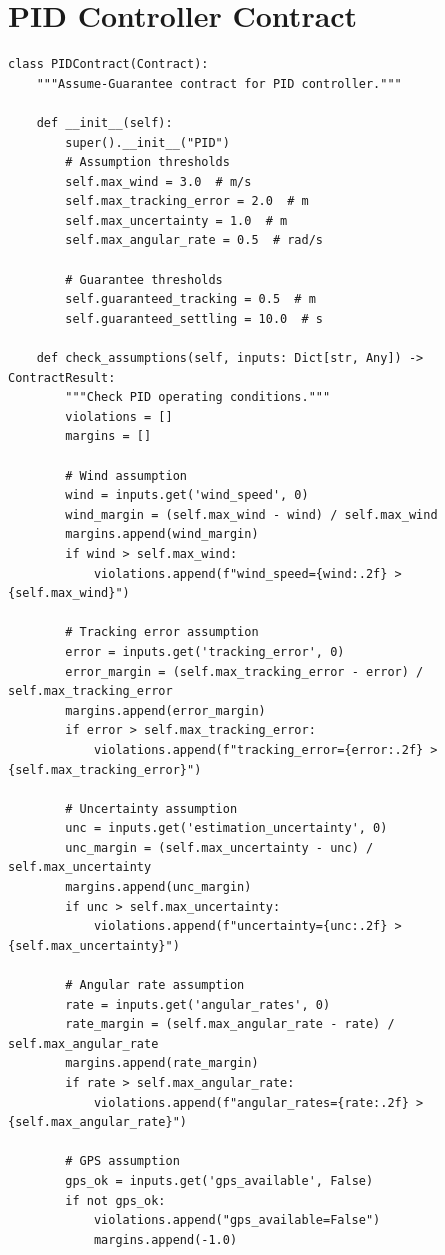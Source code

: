 \section{PID Controller Contract}

\begin{lstlisting}[caption={PID controller contract implementation}, label=lst:pid_contract]
class PIDContract(Contract):
    """Assume-Guarantee contract for PID controller."""

    def __init__(self):
        super().__init__("PID")
        # Assumption thresholds
        self.max_wind = 3.0  # m/s
        self.max_tracking_error = 2.0  # m
        self.max_uncertainty = 1.0  # m
        self.max_angular_rate = 0.5  # rad/s

        # Guarantee thresholds
        self.guaranteed_tracking = 0.5  # m
        self.guaranteed_settling = 10.0  # s

    def check_assumptions(self, inputs: Dict[str, Any]) -> ContractResult:
        """Check PID operating conditions."""
        violations = []
        margins = []

        # Wind assumption
        wind = inputs.get('wind_speed', 0)
        wind_margin = (self.max_wind - wind) / self.max_wind
        margins.append(wind_margin)
        if wind > self.max_wind:
            violations.append(f"wind_speed={wind:.2f} > {self.max_wind}")

        # Tracking error assumption
        error = inputs.get('tracking_error', 0)
        error_margin = (self.max_tracking_error - error) / self.max_tracking_error
        margins.append(error_margin)
        if error > self.max_tracking_error:
            violations.append(f"tracking_error={error:.2f} > {self.max_tracking_error}")

        # Uncertainty assumption
        unc = inputs.get('estimation_uncertainty', 0)
        unc_margin = (self.max_uncertainty - unc) / self.max_uncertainty
        margins.append(unc_margin)
        if unc > self.max_uncertainty:
            violations.append(f"uncertainty={unc:.2f} > {self.max_uncertainty}")

        # Angular rate assumption
        rate = inputs.get('angular_rates', 0)
        rate_margin = (self.max_angular_rate - rate) / self.max_angular_rate
        margins.append(rate_margin)
        if rate > self.max_angular_rate:
            violations.append(f"angular_rates={rate:.2f} > {self.max_angular_rate}")

        # GPS assumption
        gps_ok = inputs.get('gps_available', False)
        if not gps_ok:
            violations.append("gps_available=False")
            margins.append(-1.0)


\end{lstlisting}
